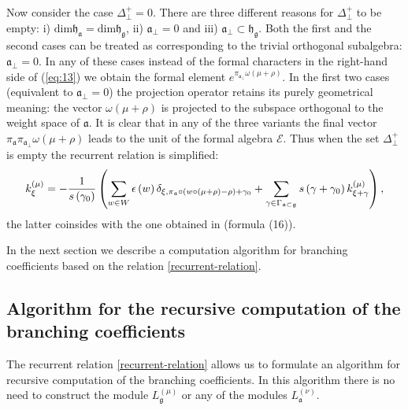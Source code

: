 \documentclass[a4paper,12pt]{article}
\theoremstyle{definition} \newtheorem{Def}{Definition}
\begin{document}
Now consider the case  $\Delta_{\bot}^{+} = 0$. There are three different reasons for $\Delta_{\bot}^{+}$ to be empty: i) $\mathrm{dim}\mathfrak{h}_{\mathfrak{a}}=\mathrm{dim}\mathfrak{h}_{\mathfrak{g}}$, ii) $\mathfrak{a}_{\bot}=0$ and iii) $\mathfrak{a}_{\bot}\subset \mathfrak{h}_{\mathfrak{g}}$. Both the first and the second cases can be treated as corresponding to the trivial orthogonal subalgebra:
$\mathfrak{a}_{\bot}=0$. In any of these cases instead of the formal characters in the right-hand side of (\ref{eq:13}) we obtain the formal element $e^{ \pi_{\mathfrak{a}_{\bot}}\omega(\mu+\rho)}$.
In the first two cases (equivalent to $\mathfrak{a}_{\bot}=0$) the projection operator retains its purely geometrical meaning: the vector $\omega(\mu+\rho)$ is projected to the subspace orthogonal to the weight space of $\mathfrak{a}$. It is clear that in any of the three variants the final vector $\pi_{\mathfrak{a}}\pi_{\mathfrak{a}_{\bot}}\omega(\mu+\rho)$ leads to the unit of the formal algebra
$\mathcal{E}$. Thus when the set $\Delta_{\bot}^{+}$ is empty the  recurrent relation is simplified:
\begin{equation}
k_{\xi }^{\left( \mu \right) }=-\frac{1}{s\left( \gamma _{0}\right) }\left(
\sum_{w\in W}\epsilon \left( w\right) \delta _{\xi ,\pi _{\frak{a}}\circ
\left( w\circ (\mu +\rho )-\rho \right) +\gamma _{0}}+\sum_{\gamma \in
\Gamma _{\frak{a}\subset \frak{g}}}s\left( \gamma +\gamma _{0}\right) k_{\xi
+\gamma }^{\left( \mu \right) }\right),  \label{recurrent relation special}
\end{equation}
the latter coinsides with the one obtained in \cite{ilyin812pbc} (formula (16)).

  In the next section we describe a computation algorithm for branching coefficients based on the relation \eqref{recurrent-relation}.

\subsection{Algorithm for the recursive computation of the branching coefficients}
\label{sec:algorithm}

The recurrent relation \eqref{recurrent-relation} allows us to formulate an algorithm for recursive computation of the branching coefficients. In this algorithm there is no need to  construct the module $L^{(\mu)}_{\mathfrak{g}}$ or any of the modules $L^{(\nu)}_{\mathfrak{a}}$.
\end{document}
